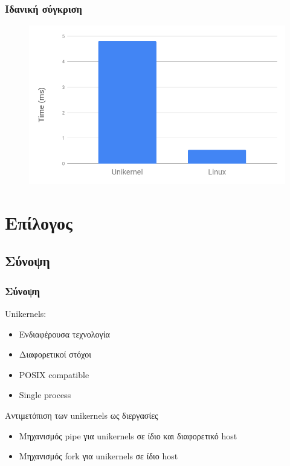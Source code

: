 \documentclass[red,slidestop,notes,compress,mathserif]{beamer}
\begin{document}
\begin{frame}
\frametitle{Ιδανική σύγκριση}
\begin{figure}
\center
\includegraphics[scale=0.45]{figures/ideal_comparison.png}
\end{figure}
\end{frame}

\section*{Επίλογος}

\subsection*{Σύνοψη}

\begin{frame}
\frametitle{Σύνοψη}
Unikernels:
\begin{itemize}
\item Ενδιαφέρουσα τεχνολογία
\item Διαφορετικοί στόχοι 
\item POSIX compatible
\item Single process
\end{itemize}
\begin{block}{Αντιμετόπιση των unikernels ως διεργασίες}
\begin{itemize}
\item Μηχανισμός pipe για unikernels σε ίδιο και διαφορετικό host
\item Μηχανισμός fork για unikernels σε ίδιο host
\end{itemize}
\end{block}
\end{frame}
\end{document}
